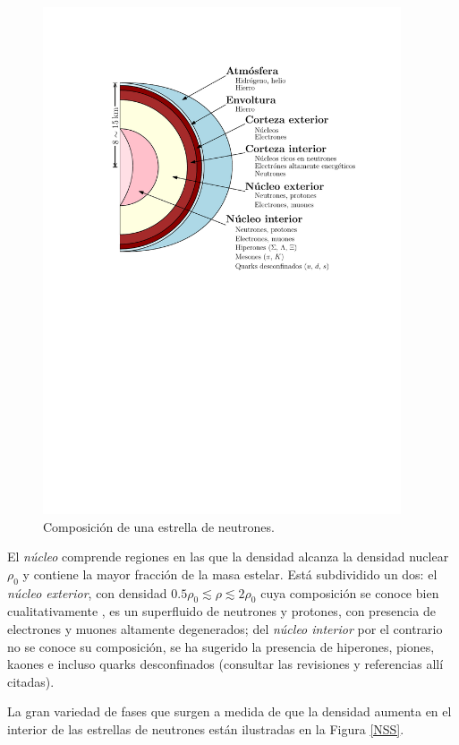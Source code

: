 \begin{figure}[H]
    \centering
    \includegraphics[width=300pt]{figures/neutronstar.pdf}
    \caption{Composición de una estrella de neutrones.\protect\footnotemark}
    \label{NSC}
\end{figure}



El \emph{núcleo} comprende regiones en las que la densidad alcanza la densidad nuclear $\rho_0$ y contiene la mayor fracción de la masa estelar. Está subdividido un dos: el \emph{núcleo exterior}, con densidad $\num{0.5}\rho_0\lesssim\rho\lesssim 2\rho_0$  cuya composición se conoce bien cualitativamente \cite{Haensel2007NeutronStructure}, es un superfluido de neutrones y protones, con presencia de electrones y muones altamente degenerados; del \emph{núcleo interior} por el contrario no se conoce su composición, se ha sugerido la presencia de hiperones, piones, kaones e incluso quarks desconfinados (consultar las revisiones \cite{Lattimer2004,Potekhin} y referencias allí citadas).


La gran variedad de fases que surgen a medida de que la densidad aumenta en el interior de las estrellas de neutrones están ilustradas en la Figura \ref{NSS}.     

